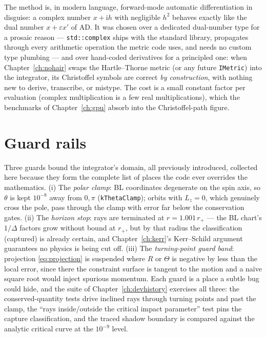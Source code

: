 The method is, in modern language, forward-mode automatic
differentiation in disguise: a complex number $x + \mathrm{i}h$ with
negligible $h^2$ behaves exactly like the dual number $x + \varepsilon
x'$ of AD. It was chosen over a dedicated dual-number type for a
prosaic reason — \texttt{std::complex} ships with the standard
library, propagates through every arithmetic operation the metric code
uses, and needs no custom type plumbing — and over hand-coded
derivatives for a principled one: when Chapter~\ref{ch:nohair} swaps
the Hartle--Thorne metric (or any future \texttt{IMetric}) into the
integrator, its Christoffel symbols are correct \emph{by construction},
with nothing new to derive, transcribe, or mistype. The cost is a
small constant factor per evaluation (complex multiplication is a few
real multiplications), which the benchmarks of Chapter~\ref{ch:gpu}
absorb into the Christoffel-path figure.

\section{Guard rails}
\label{sec:guards}

Three guards bound the integrator's domain, all previously introduced,
collected here because they form the complete list of places the code
ever overrides the mathematics. (i) The \emph{polar clamp}: BL
coordinates degenerate on the spin axis, so $\theta$ is kept
$10^{-8}$ away from $0, \pi$ (\texttt{kThetaClamp}); orbits with
$L_z = 0$, which genuinely cross the pole, pass through the clamp with
error far below the conservation gates. (ii) The \emph{horizon stop}:
rays are terminated at $r = 1.001\,r_+$ — the BL chart's $1/\Delta$
factors grow without bound at $r_+$, but by that radius the
classification (captured) is already certain, and Chapter~\ref{ch:kerr}'s
Kerr--Schild argument guarantees no physics is being cut off. (iii) The
\emph{turning-point guard band}: projection \eqref{eq:projection} is
suspended where $R$ or $\Theta$ is negative by less than the local
error, since there the constraint surface is tangent to the motion and
a na\"ive square root would inject spurious momentum. Each guard is a
place a subtle bug could hide, and the suite of
Chapter~\ref{ch:devhistory} exercises all three: the
conserved-quantity tests drive inclined rays through turning points
and past the clamp, the ``rays inside/outside the critical impact
parameter'' test pins the capture classification, and the traced
shadow boundary is compared against the analytic critical curve at the
$10^{-9}$ level.

